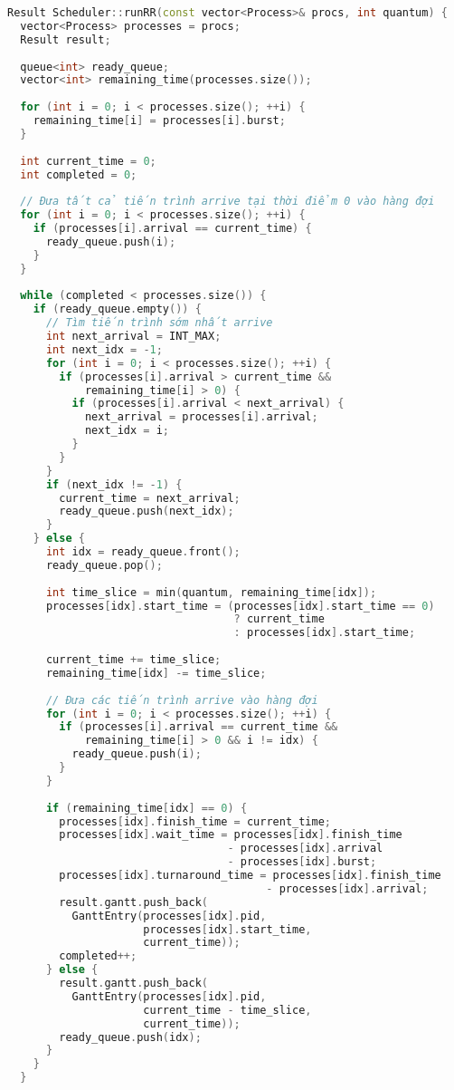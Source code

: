 \begin{lstlisting}[language=C++,caption={Cài đặt Round Robin}]
Result Scheduler::runRR(const vector<Process>& procs, int quantum) {
  vector<Process> processes = procs;
  Result result;
  
  queue<int> ready_queue;
  vector<int> remaining_time(processes.size());
  
  for (int i = 0; i < processes.size(); ++i) {
    remaining_time[i] = processes[i].burst;
  }
  
  int current_time = 0;
  int completed = 0;
  
  // Đưa tất cả tiến trình arrive tại thời điểm 0 vào hàng đợi
  for (int i = 0; i < processes.size(); ++i) {
    if (processes[i].arrival == current_time) {
      ready_queue.push(i);
    }
  }
  
  while (completed < processes.size()) {
    if (ready_queue.empty()) {
      // Tìm tiến trình sớm nhất arrive
      int next_arrival = INT_MAX;
      int next_idx = -1;
      for (int i = 0; i < processes.size(); ++i) {
        if (processes[i].arrival > current_time && 
            remaining_time[i] > 0) {
          if (processes[i].arrival < next_arrival) {
            next_arrival = processes[i].arrival;
            next_idx = i;
          }
        }
      }
      if (next_idx != -1) {
        current_time = next_arrival;
        ready_queue.push(next_idx);
      }
    } else {
      int idx = ready_queue.front();
      ready_queue.pop();
      
      int time_slice = min(quantum, remaining_time[idx]);
      processes[idx].start_time = (processes[idx].start_time == 0) 
                                   ? current_time 
                                   : processes[idx].start_time;
      
      current_time += time_slice;
      remaining_time[idx] -= time_slice;
      
      // Đưa các tiến trình arrive vào hàng đợi
      for (int i = 0; i < processes.size(); ++i) {
        if (processes[i].arrival == current_time && 
            remaining_time[i] > 0 && i != idx) {
          ready_queue.push(i);
        }
      }
      
      if (remaining_time[idx] == 0) {
        processes[idx].finish_time = current_time;
        processes[idx].wait_time = processes[idx].finish_time 
                                  - processes[idx].arrival 
                                  - processes[idx].burst;
        processes[idx].turnaround_time = processes[idx].finish_time 
                                        - processes[idx].arrival;
        result.gantt.push_back(
          GanttEntry(processes[idx].pid, 
                     processes[idx].start_time, 
                     current_time));
        completed++;
      } else {
        result.gantt.push_back(
          GanttEntry(processes[idx].pid, 
                     current_time - time_slice, 
                     current_time));
        ready_queue.push(idx);
      }
    }
  }
  

\end{lstlisting}
